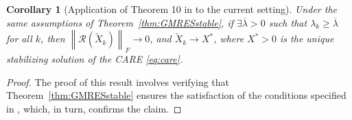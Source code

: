\documentclass[a4paper,10pt]{article}
\def\bar{\overline}\def\tilde{\widetilde}
\newcommand{\norm}[1]{\left\lVert#1\right\rVert}
\newtheorem{corollary}[definition]{Corollary}
\begin{document}
%
%
%



\begin{corollary}[Application of Theorem 10 in \cite{benner2016inexact} to the current setting]
	Under the same assumptions of Theorem~\ref{thm:GMRESstable}, if $\exists \bar\lambda >0$ such that $\lambda_k  \ge \bar\lambda$ for all $k$, then $\norm{ \mathcal{R}(\tilde X_k) }_F \rightarrow 0$, and
	$\tilde X_k \rightarrow X^*$, where $X^* >0$ is the unique stabilizing solution of the CARE \eqref{eq:care}. 
\label{thm:conv_INK}
\end{corollary}

\begin{proof}
	The proof of this result involves verifying that Theorem~\ref{thm:GMRESstable} ensures the satisfaction of the conditions specified in \cite[Theorem 10]{benner2016inexact}, which, in turn, confirms the claim.
\end{proof}
\end{document}
